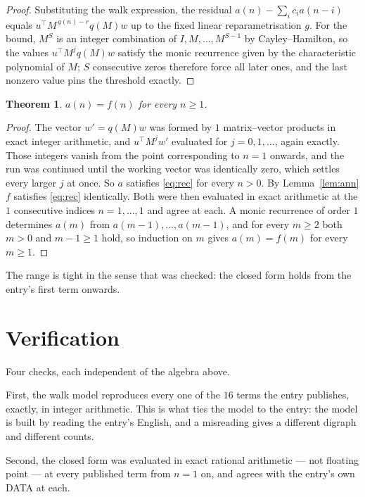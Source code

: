 \documentclass[11pt,a4paper]{article}
\theoremstyle{plain}
\newtheorem{theorem}{Theorem}
\theoremstyle{definition}
\begin{document}
\begin{proof}
Substituting the walk expression, the residual $a(n)-\sum_ic_ia(n-i)$ equals
$u^{\!\top}M^{\,g(n)-r}q(M)w$ up to the fixed linear reparametrisation $g$. For the bound,
$M^{S}$ is an integer combination of $I,M,\dots,M^{S-1}$ by Cayley--Hamilton, so the values
$u^{\!\top}M^{j}q(M)w$ satisfy the monic recurrence given by the characteristic polynomial of
$M$; $S$ consecutive zeros therefore force all later ones, and the last nonzero value pins the
threshold exactly.
\end{proof}

\begin{theorem}
$a(n)=f(n)$ for every $n\ge1$.
\end{theorem}

\begin{proof}
The vector $w'=q(M)w$ was formed by $1$ matrix--vector products in exact integer
arithmetic, and $u^{\!\top}M^{j}w'$ evaluated for $j=0,1,\dots$, again exactly. Those integers
vanish from the point corresponding to $n=1$ onwards, and the run was continued until the
working vector was identically zero, which settles every larger $j$ at once. So $a$ satisfies
\eqref{eq:rec} for every $n>0$. By Lemma~\ref{lem:ann} $f$ satisfies \eqref{eq:rec}
identically. Both were then evaluated in exact arithmetic at the $1$ consecutive indices
$n=1,\dots,1$ and agree at each. A monic recurrence of order $1$
determines $a(m)$ from $a(m-1),\dots,a(m-1)$, and for every $m\ge2$ both
$m>0$ and $m-1\ge1$ hold, so induction on $m$ gives $a(m)=f(m)$ for every
$m\ge1$.
\end{proof}

The range is tight in the sense that was checked: the closed form holds from the entry's first term onwards.

\section{Verification}

Four checks, each independent of the algebra above.

First, the walk model reproduces every one of the $16$ terms the entry publishes,
exactly, in integer arithmetic. This is what ties the model to the entry: the model is built
by reading the entry's English, and a misreading gives a different digraph and different
counts.

Second, the closed form was evaluated in exact rational arithmetic --- not floating point ---
at every published term from $n=1$ on, and agrees with the entry's own DATA at each.
\end{document}
